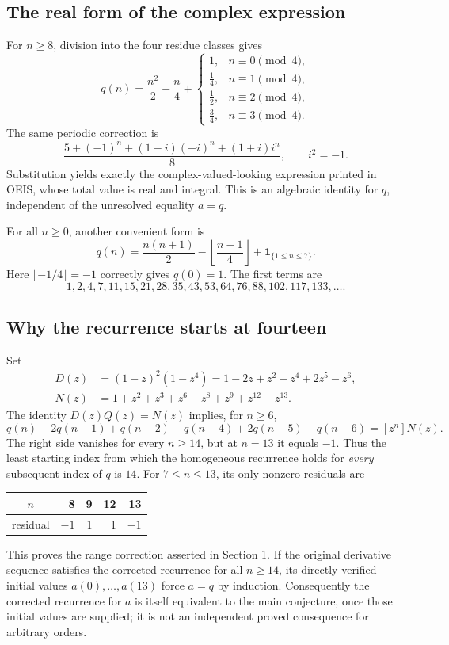 \documentclass[11pt,a4paper]{article}
\numberwithin{equation}{section}
\theoremstyle{definition}
\theoremstyle{remark}
\newcommand{\coef}[2]{[#1^{#2}]}
\newcommand{\ind}[1]{\mathbf{1}_{\{#1\}}}
\begin{document}
\subsection{The real form of the complex expression}
For $n\ge8$, division into the four residue classes gives
\begin{equation}\label{eq:residueq}
 q(n)=\frac{n^2}{2}+\frac n4+
 \begin{cases}
 1,&n\equiv0\pmod4,\\
 \tfrac14,&n\equiv1\pmod4,\\
 \tfrac12,&n\equiv2\pmod4,\\
 \tfrac34,&n\equiv3\pmod4.
 \end{cases}
\end{equation}
The same periodic correction is
\[
 \frac{5+(-1)^n+(1-i)(-i)^n+(1+i)i^n}{8},\qquad i^2=-1.
\]
Substitution yields exactly the complex-valued-looking expression printed
in OEIS, whose total value is real and integral. This is an algebraic
identity for $q$, independent of the unresolved equality $a=q$.

For all $n\ge0$, another convenient form is
\[
 q(n)=\frac{n(n+1)}2-\left\lfloor\frac{n-1}{4}\right\rfloor
                         +\ind{1\le n\le7}.
\]
Here $\lfloor-1/4\rfloor=-1$ correctly gives $q(0)=1$.
The first terms are
\[
 1,2,4,7,11,15,21,28,35,43,53,64,76,88,102,117,133,\ldots.
\]

\subsection{Why the recurrence starts at fourteen}
Set
\begin{align*}
 D(z)&=(1-z)^2(1-z^4)=1-2z+z^2-z^4+2z^5-z^6,\\
 N(z)&=1+z^2+z^3+z^6-z^8+z^9+z^{12}-z^{13}.
\end{align*}
The identity $D(z)Q(z)=N(z)$ implies, for $n\ge6$,
\begin{equation}\label{eq:inhomogeneous}
 q(n)-2q(n-1)+q(n-2)-q(n-4)+2q(n-5)-q(n-6)
 =\coef{z}{n}N(z).
\end{equation}
The right side vanishes for every $n\ge14$, but at $n=13$ it equals $-1$.
Thus the least starting index from which the homogeneous recurrence holds
for \emph{every} subsequent index of $q$ is $14$.
For $7\le n\le13$, its only nonzero residuals are
\begin{center}
\begin{tabular}{c|rrrr}
$n$&8&9&12&13\\\hline
residual&$-1$&1&1&$-1$
\end{tabular}
\end{center}
This proves the range correction asserted in Section 1.
If the original derivative sequence satisfies the corrected recurrence
for all $n\ge14$, its directly verified initial values $a(0),\ldots,a(13)$
force $a=q$ by induction. Consequently the corrected recurrence for $a$
is itself equivalent to the main conjecture, once those initial values
are supplied; it is not an independent proved consequence for arbitrary
orders.
\end{document}

